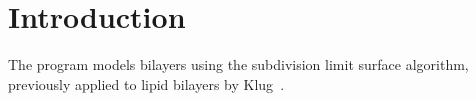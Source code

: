 \section{Introduction}

The  program models bilayers using the subdivision limit surface algorithm, previously applied to lipid bilayers by Klug~\cite{Feng2006}.


